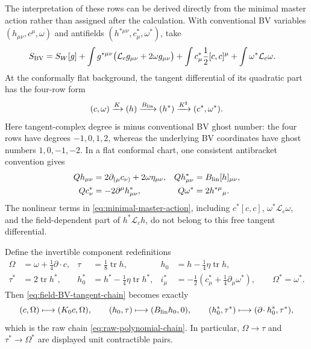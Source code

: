 \documentclass[11pt]{article}
\theoremstyle{definition}
\theoremstyle{remark}
\newcommand{\cL}{\mathcal L}
\begin{document}
The interpretation of these rows can be derived directly from the minimal
master action rather than assigned after the calculation.  With conventional
BV variables $(h_{\mu\nu},c^\mu,\omega)$ and antifields
$(h^{*\mu\nu},c^*_\mu,\omega^*)$, take
\begin{align}\label{eq:minimal-master-action}
 S_{\rm BV}={}&S_W[g]
 +\int g^{*\mu\nu}\bigl(\cL_cg_{\mu\nu}+2\omega g_{\mu\nu}\bigr)
 +\int c^*_\mu\frac12[c,c]^\mu
 +\int\omega^*\cL_c\omega .
\end{align}
At the conformally flat background, the tangent differential of its
quadratic part has the four-row form
\begin{equation}\label{eq:field-BV-tangent-chain}
 (c,\omega)\xrightarrow{K}(h)
 \xrightarrow{B_{\rm lin}}(h^*)
 \xrightarrow{K^\sharp}(c^*,\omega^*).
\end{equation}
Here tangent-complex degree is minus conventional BV ghost number: the four
rows have degrees $-1,0,1,2$, whereas the underlying BV coordinates have
ghost numbers $1,0,-1,-2$.  In a flat conformal chart, one consistent
antibracket convention gives
\begin{align}
 Qh_{\mu\nu}&=2\partial_{(\mu}c_{\nu)}+2\omega\eta_{\mu\nu},
 &Qh^*_{\mu\nu}&=B_{\rm lin}[h]_{\mu\nu},\nonumber\\
 Qc^*_\nu&=-2\partial^\mu h^*_{\mu\nu},
 &Q\omega^*&=2h^{*\mu}{}_{\mu}.
 \label{eq:quadratic-field-BV-differential}
\end{align}
The nonlinear terms in \eqref{eq:minimal-master-action}, including
$c^*[c,c]$, $\omega^*\cL_c\omega$, and the field-dependent part of
$h^*\cL_ch$, do not belong to this free tangent differential.

Define the invertible component redefinitions
\begin{align}\label{eq:field-raw-redefinitions}
 \Omega&=\omega+\frac14\partial\!\cdot c,
 &\tau&=\frac18\operatorname{tr}h,
 &h_0&=h-\frac14\eta\operatorname{tr}h,\nonumber\\
 \tau^*&=2\operatorname{tr}h^*,
 &h_0^*&=h^*-\frac14\eta\operatorname{tr}h^*,
 &i^*_\mu&=-\frac12\left(c^*_\mu+\frac14\partial_\mu\omega^*\right),
 \qquad \Omega^*=\omega^*.
\end{align}
Then \eqref{eq:field-BV-tangent-chain} becomes exactly
\begin{equation}
 (c,\Omega)\longmapsto(K_0c,\Omega),\qquad
 (h_0,\tau)\longmapsto(B_{\rm lin}h_0,0),\qquad
 (h_0^*,\tau^*)\longmapsto(\partial\!\cdot h_0^*,\tau^*),
\end{equation}
which is the raw chain \eqref{eq:raw-polynomial-chain}.  In particular,
$\Omega\to\tau$ and $\tau^*\to\Omega^*$ are displayed unit contractible
pairs.
\end{document}
